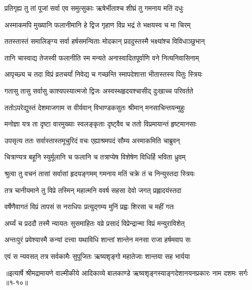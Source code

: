 \twolineshloka
{प्रतिगृह्य तु तां पूजां सर्वा एव समुत्सुकाः}
{ऋषेर्भीताश्च शीघ्रं तु गमनाय मतिं दधुः} %

\twolineshloka
{अस्माकमपि मुख्यानि फलानीमानि हे द्विज}
{गृहाण विप्र भद्रं ते भक्षयस्व च मा चिरम्} %

\twolineshloka
{ततस्तास्तं समालिङ्ग्य सर्वा हर्षसमन्विताः}
{मोदकान् प्रददुस्तस्मै भक्ष्यांश्च विविधाञ्छुभान्} %

\twolineshloka
{तानि चास्वाद्य तेजस्वी फलानीति स्म मन्यते}
{अनास्वादितपूर्वाणि वने नित्यनिवासिनाम्} %

\twolineshloka
{आपृच्छ्य च तदा विप्रं व्रतचर्यां निवेद्य च}
{गच्छन्ति स्मापदेशात्ता भीतास्तस्य पितुः स्त्रियः} %

\twolineshloka
{गतासु तासु सर्वासु काश्यपस्यात्मजो द्विजः}
{अस्वस्थहृदयश्चासीद् दुःखाच्च परिवर्तते} %

\twolineshloka
{ततोऽपरेद्युस्तं देशमाजगाम स वीर्यवान्}
{विभाण्डकसुतः श्रीमान् मनसाचिन्तयन्मुहुः} %

\twolineshloka
{मनोज्ञा यत्र ता दृष्टा वारमुख्याः स्वलङ्कृताः}
{दृष्ट्वैव च ततो विप्रमायान्तं हृष्टमानसाः} %

\twolineshloka
{उपसृत्य ततः सर्वास्तास्तमूचुरिदं वचः}
{एह्याश्रमपदं सौम्य अस्माकमिति चाब्रुवन्} %

\twolineshloka
{चित्राण्यत्र बहूनि स्युर्मूलानि च फलानि च}
{तत्राप्येष विशेषेण विधिर्हि भविता ध्रुवम्} %

\twolineshloka
{श्रुत्वा तु वचनं तासां सर्वासां हृदयङ्गमम्}
{गमनाय मतिं चक्रे तं च निन्युस्तदा स्त्रियः} %

\twolineshloka
{तत्र चानीयमाने तु विप्रे तस्मिन् महात्मनि}
{ववर्ष सहसा देवो जगत् प्रह्लादयंस्तदा} %

\twolineshloka
{वर्षेणैवागतं विप्रं तापसं स नराधिपः}
{प्रत्युद्गम्य मुनिं प्रह्वः शिरसा च महीं गतः} %

\twolineshloka
{अर्घ्यं च प्रददौ तस्मै न्यायतः सुसमाहितः}
{वव्रे प्रसादं विप्रेन्द्रान्मा विप्रं मन्युराविशेत्} %

\twolineshloka
{अन्तःपुरं प्रवेश्यास्मै कन्यां दत्त्वा यथाविधि}
{शान्तां शान्तेन मनसा राजा हर्षमवाप सः} %

\twolineshloka
{एवं स न्यवसत् तत्र सर्वकामैः सुपूजितः}
{ऋष्यशृङ्गो महातेजाः शान्तया सह भार्यया} %


॥इत्यार्षे श्रीमद्रामायणे वाल्मीकीये आदिकाव्ये बालकाण्डे ऋष्यशृङ्गस्याङ्गदेशानयनप्रकारः नाम दशमः सर्गः ॥१-१०॥
